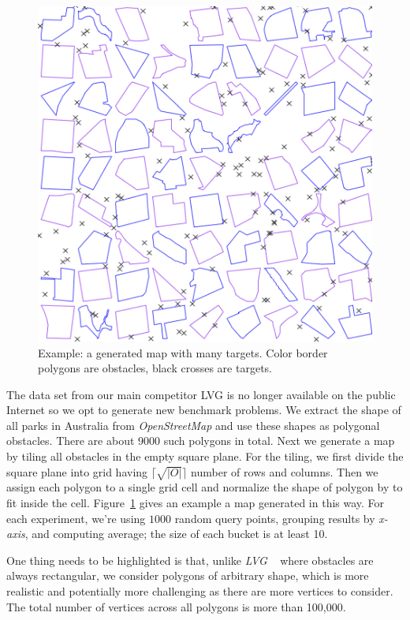 \begin{figure}[!hbt]
  \centering
  \includegraphics[width=.7\linewidth]{pic/distribution.png}
  \caption{\small Example: a generated map with many targets. Color border polygons are
  obstacles, black crosses are targets.}\label{distribution}
\end{figure}

The data set from our main competitor LVG\cite{zhang2004spatial}
is no longer available on the public Internet so we opt to generate new benchmark problems.
We extract the shape of all parks in Australia from \textit{OpenStreetMap}\cite{OpenStreetMap} and
use these shapes as polygonal obstacles. There are about 9000 such polygons in total.
Next we generate a map by tiling all obstacles in the empty square plane.
For the tiling, we first divide the square plane into grid having $\lceil\sqrt{|O|}\rceil$ number of rows and columns.
Then we assign each polygon to a single grid cell and normalize the shape of polygon by to fit inside the cell.
Figure~\ref{distribution} gives an example a map generated in this way.
For each experiment, we're using $1000$ random query points, grouping results by
\textit{x-axis}, and computing average; the size of each bucket is at least 10. 

One thing needs to be highlighted is that,
unlike \textit{LVG} ~\cite{zhang2004spatial} where obstacles are always rectangular,
we consider polygons of arbitrary shape, which is more realistic and potentially more challenging as there are more vertices to consider.
The total number of vertices across all polygons is more than 100,000. 

